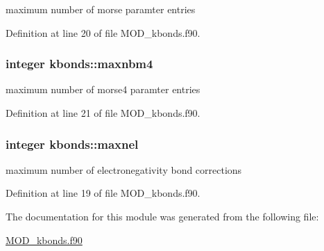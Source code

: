 maximum number of morse paramter entries 



Definition at line 20 of file M\-O\-D\-\_\-kbonds.\-f90.

\hypertarget{classkbonds_a7722f5df93f05ffe051844b4b14fa9de}{
\subsubsection[{maxnbm4}]{\setlength{\rightskip}{0pt plus 5cm}integer kbonds\-::maxnbm4}}\label{classkbonds_a7722f5df93f05ffe051844b4b14fa9de}


maximum number of morse4 paramter entries 



Definition at line 21 of file M\-O\-D\-\_\-kbonds.\-f90.

\hypertarget{classkbonds_a6db85c30f12f7ced42381f0176090d23}{
\subsubsection[{maxnel}]{\setlength{\rightskip}{0pt plus 5cm}integer kbonds\-::maxnel}}\label{classkbonds_a6db85c30f12f7ced42381f0176090d23}


maximum number of electronegativity bond corrections 



Definition at line 19 of file M\-O\-D\-\_\-kbonds.\-f90.



The documentation for this module was generated from the following file\-:\begin{DoxyCompactItemize}
\item 
\hyperlink{MOD__kbonds_8f90}{M\-O\-D\-\_\-kbonds.\-f90}\end{DoxyCompactItemize}
